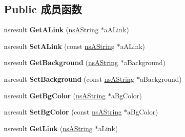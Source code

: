 \subsection*{Public 成员函数}
\begin{DoxyCompactItemize}
\item 
\mbox{\label{interfacens_i_d_o_m_h_t_m_l_body_element_ae88ef5f4cc950f87a531bb740bd1afe9}} 
nsresult {\bfseries Get\+A\+Link} (\hyperlink{structns_string_container}{ns\+A\+String} $\ast$a\+A\+Link)
\item 
\mbox{\label{interfacens_i_d_o_m_h_t_m_l_body_element_a85eb80d73b1a6730925a359f11e6c33c}} 
nsresult {\bfseries Set\+A\+Link} (const \hyperlink{structns_string_container}{ns\+A\+String} $\ast$a\+A\+Link)
\item 
\mbox{\label{interfacens_i_d_o_m_h_t_m_l_body_element_a65420dbe0453b1de0d3de06be5c85d08}} 
nsresult {\bfseries Get\+Background} (\hyperlink{structns_string_container}{ns\+A\+String} $\ast$a\+Background)
\item 
\mbox{\label{interfacens_i_d_o_m_h_t_m_l_body_element_aeed21e0afc76df559acbffa7a7b6a123}} 
nsresult {\bfseries Set\+Background} (const \hyperlink{structns_string_container}{ns\+A\+String} $\ast$a\+Background)
\item 
\mbox{\label{interfacens_i_d_o_m_h_t_m_l_body_element_a0f40b76eae6d8f6c86bf6c1f6cde752f}} 
nsresult {\bfseries Get\+Bg\+Color} (\hyperlink{structns_string_container}{ns\+A\+String} $\ast$a\+Bg\+Color)
\item 
\mbox{\label{interfacens_i_d_o_m_h_t_m_l_body_element_a238242f322116b55e265301331a89b5b}} 
nsresult {\bfseries Set\+Bg\+Color} (const \hyperlink{structns_string_container}{ns\+A\+String} $\ast$a\+Bg\+Color)
\item 
\mbox{\label{interfacens_i_d_o_m_h_t_m_l_body_element_ac31bc9c626e69fc261529cdc1b05f4c3}} 
nsresult {\bfseries Get\+Link} (\hyperlink{structns_string_container}{ns\+A\+String} $\ast$a\+Link)

\end{DoxyCompactItemize}
